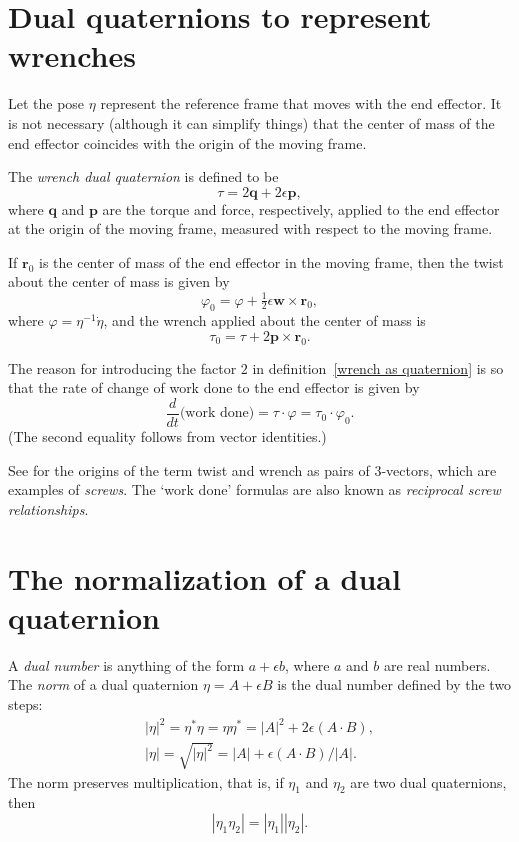 \documentclass[reqno,12pt]{amsart}
\begin{document}
\section{Dual quaternions to represent wrenches}

Let the pose $\eta$ represent the reference frame that moves with the end effector.  It is not necessary (although it can simplify things) that the center of mass of the end effector coincides with the origin of the moving frame.

The \emph{wrench dual quaternion} is defined to be
\begin{equation}
\label{wrench as quaternion}
\tau = 2 \bm q + 2 \epsilon \bm p,
\end{equation}
where $\bm q$ and $\bm p$ are the torque and force, respectively, applied to the end effector at the origin of the moving frame, measured with respect to the moving frame.

If $\bm r_0$ is the center of mass of the end effector in the moving frame, then the twist about the center of mass is given by
\begin{equation}
\label{twist correction}
\varphi_0 = 
\varphi + \tfrac12\epsilon\bm w \times \bm r_0,
\end{equation}
where $\varphi = \eta^{-1} \dot \eta$, and the wrench applied about the center of mass is
\begin{equation}
\label{torque correction}
\tau_0 = 
\tau + 2 \bm p \times \bm r_0.
\end{equation}

The reason for introducing the factor $2$ in definition~\eqref{wrench as quaternion} is so that the rate of change of work done to the end effector is given by
\begin{equation}
\label{dot h tau varphi}
\frac{d}{dt} \text{(work done)} = \tau \cdot \varphi = \tau_0 \cdot \varphi_0 .
\end{equation}
(The second equality follows from vector identities.)

See \cite{ball} for the origins of the term twist and wrench as pairs of 3-vectors, which are examples of \emph{screws}.  The `work done' formulas are also known as \emph{reciprocal screw relationships}.

\section{The normalization of a dual quaternion}

A \emph{dual number} is anything of the form $a + \epsilon b$, where $a$ and $b$ are real numbers.  The \emph{norm} of a dual quaternion $\eta = A + \epsilon B$ is the dual number defined by the two steps:
\begin{gather}
|\eta|^2 = \eta^* \eta = \eta \eta^* = |A|^2 + 2 \epsilon (A \cdot B) ,\\
\label{norm}
|\eta| = \sqrt{|\eta|^2} = |A| + \epsilon (A \cdot B) / |A| .
\end{gather}
The norm preserves multiplication, that is, if $\eta_1$ and $\eta_2$ are two dual quaternions, then
\begin{equation}
|\eta_1 \eta_2| = |\eta_1| |\eta_2| .
\end{equation}
\end{document}
